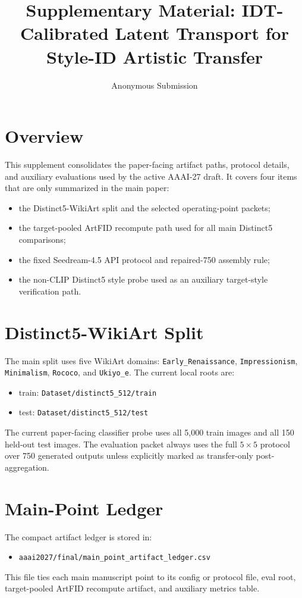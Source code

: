 \documentclass[letterpaper]{article}
\title{Supplementary Material: IDT-Calibrated Latent Transport for Style-ID Artistic Transfer}
\author{Anonymous Submission}
\begin{document}
\maketitle

\section{Overview}
This supplement consolidates the paper-facing artifact paths, protocol details, and auxiliary evaluations used by the active AAAI-27 draft. It covers four items that are only summarized in the main paper:
\begin{itemize}
\item the Distinct5-WikiArt split and the selected operating-point packets;
\item the target-pooled ArtFID recompute path used for all main Distinct5 comparisons;
\item the fixed Seedream-4.5 API protocol and repaired-750 assembly rule;
\item the non-CLIP Distinct5 style probe used as an auxiliary target-style verification path.
\end{itemize}

\section{Distinct5-WikiArt Split}
The main split uses five WikiArt domains: \texttt{Early\_Renaissance}, \texttt{Impressionism}, \texttt{Minimalism}, \texttt{Rococo}, and \texttt{Ukiyo\_e}. The current local roots are:
\begin{itemize}
\item train: \texttt{Dataset/distinct5\_512/train}
\item test: \texttt{Dataset/distinct5\_512/test}
\end{itemize}
The current paper-facing classifier probe uses all 5,000 train images and all 150 held-out test images. The evaluation packet always uses the full $5\times5$ protocol over 750 generated outputs unless explicitly marked as transfer-only post-aggregation.

\section{Main-Point Ledger}
The compact artifact ledger is stored in:
\begin{itemize}
\item \texttt{aaai2027/final/main\_point\_artifact\_ledger.csv}
\end{itemize}
This file ties each main manuscript point to its config or protocol file, eval root, target-pooled ArtFID recompute artifact, and auxiliary metrics table.
\end{document}
